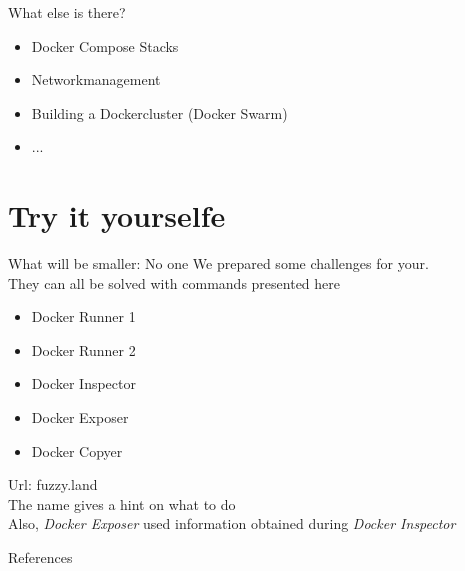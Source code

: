\documentclass[12pt]{beamer}
\begin{document}
\begin{frame}[fragile]{What else is there?}
    \begin{itemize}[label=\textcolor{green}{\textbullet}]
        \item Docker Compose Stacks
        \item Networkmanagement
        \item Building a Dockercluster (Docker Swarm)
        \item ...
    \end{itemize}
\end{frame}


\section{Try it yourselfe}

\begin{frame}[fragile]{What will be smaller: No one}
    We prepared some challenges for your. \\
    They can all be solved with commands presented here
    \begin{itemize}[label=\textcolor{black}{\textbullet}]
        \item Docker Runner 1
        \item Docker Runner 2
        \item Docker Inspector
        \item Docker Exposer
        \item Docker Copyer
    \end{itemize}
    Url: fuzzy.land \\
    The name gives a hint on what to do\\
    Also, \emph{Docker Exposer} used information obtained during \emph{Docker Inspector}
\end{frame}

\begin{frame}[allowframebreaks]{References}
  \printbibliography[heading=none]
\end{frame}
\end{document}
